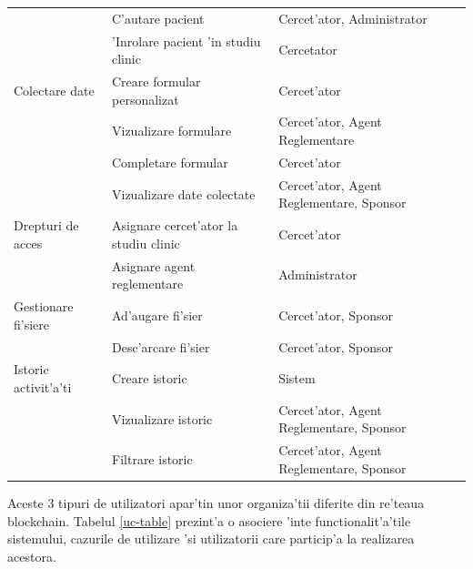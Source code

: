 \documentclass[12pt,a4paper,twoside]{report}
\begin{document}
\begin{longtable}{|p{5cm}|p{5.3cm}|p{5.1cm}|}
                         & C'autare pacient                            & Cercet'ator, Administrator                              \\ \cline{2-3} 
                         & 'Inrolare pacient 'in studiu clinic          & Cercetator                                             \\ \hline
Colectare date           & Creare formular personalizat               & Cercet'ator                                             \\ \cline{2-3} 
                         & Vizualizare formulare                      & Cercet'ator, Agent Reglementare                         \\ \cline{2-3} 
                         & Completare formular                        & Cercet'ator                                             \\ \cline{2-3} 
                         & Vizualizare date colectate                 & Cercet'ator, Agent Reglementare, Sponsor                \\ \hline
Drepturi de acces        & Asignare cercet'ator la studiu clinic       & Cercet'ator                                             \\ \cline{2-3} 
                         & Asignare agent reglementare                & Administrator                                          \\ \hline
Gestionare fi'siere       & Ad'augare fi'sier                            & Cercet'ator, Sponsor                                    \\ \cline{2-3} 
                         & Desc'arcare fi'sier                          & Cercet'ator, Sponsor                                    \\ \hline
Istoric activit'a'ti       & Creare istoric                             & Sistem                                                 \\ \hline
                         & Vizualizare istoric                        & Cercet'ator, Agent Reglementare, Sponsor                \\ \cline{2-3} 
                         & Filtrare istoric                           & Cercet'ator, Agent Reglementare, Sponsor                \\ \hline
\end{longtable}

 Aceste 3 tipuri de utilizatori apar'tin unor organiza'tii diferite din re'teaua blockchain. Tabelul \ref{uc-table} prezint'a o asociere 'inte functionalit'a'tile sistemului, cazurile de utilizare 'si utilizatorii care particip'a la realizarea acestora.
\end{document}

